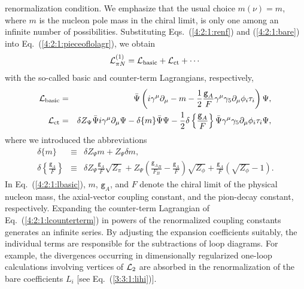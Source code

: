 \documentclass[twoside,12pt]{article}
\begin{document}
renormalization condition.
   We emphasize that the usual choice $m(\nu)=m$, where $m$
is the nucleon pole mass in the chiral limit, is only one among an infinite
number of possibilities.
   Substituting Eqs.\ (\ref{4:2:1:renf}) and (\ref{4:2:1:bare}) into
Eq.\ (\ref{4:2:1:pieceoflolagr}), we obtain
\begin{equation}
\label{4:2:1:bct}
{\cal L}_{\pi N}^{(1)}={\cal L}_{\rm basic}+{\cal L}_{\rm ct}+\cdots
\end{equation}
with the so-called basic and counter-term Lagrangians,
respectively,
\begin{eqnarray}
\label{4:2:1:lbasic}
{\cal L}_{\rm basic}&=&
\bar \Psi \left( i\gamma^\mu\partial_\mu - m
-\frac{1}{2} \frac{\texttt{g}_{A}}{F}\gamma^\mu\gamma_5\partial_\mu \phi_i\tau_i\right) \Psi,\\
\label{4:2:1:lcounterterm}
{\cal L}_{\rm ct}&=&\delta Z_\Psi \bar \Psi i\gamma^\mu\partial_\mu
\Psi
-\delta\{m\}\bar{\Psi}\Psi
-\frac{1}{2}\delta\left\{\frac{\texttt{g}_{A}}{F}\right\}
\bar{\Psi}\gamma^\mu \gamma_5  \partial_\mu \phi_i  \tau_i\Psi,
\end{eqnarray}
where we introduced the abbreviations
\begin{eqnarray*}
\delta\{m\}&\equiv&\delta Z_\Psi m+Z_\Psi\delta m,\\
\delta\left\{\frac{\texttt{g}_{A}}{F}\right\}&\equiv&
\delta Z_\Psi \frac{\texttt{g}_{A}}{F}\sqrt{Z_\pi}
+Z_\Psi\left(\frac{{\texttt{g}_{A}}_B}{F_B}-
\frac{\texttt{g}_{A}}{F}
\right)\sqrt{Z_\phi}
+\frac{\texttt{g}_{A}}{F}(\sqrt{Z_\phi}-1).
\end{eqnarray*}
   In Eq.\ (\ref{4:2:1:lbasic}), $m$, $\texttt{g}_A$,
and $F$ denote the chiral limit of the physical nucleon mass, the axial-vector coupling
constant, and the pion-decay constant, respectively.
   Expanding the counter-term Lagrangian of Eq.\ (\ref{4:2:1:lcounterterm})
in powers of the renormalized coupling constants generates an infinite
series.
   By adjusting the expansion coefficients suitably, the individual terms are responsible for
the subtractions of loop diagrams.
   For example, the divergences occurring in dimensionally
regularized one-loop calculations involving vertices of ${\cal L}_2$ are absorbed in the
renormalization of the bare coefficients $L_i$ [see Eq.~(\ref{3:3:1:lihi})].
\end{document}
